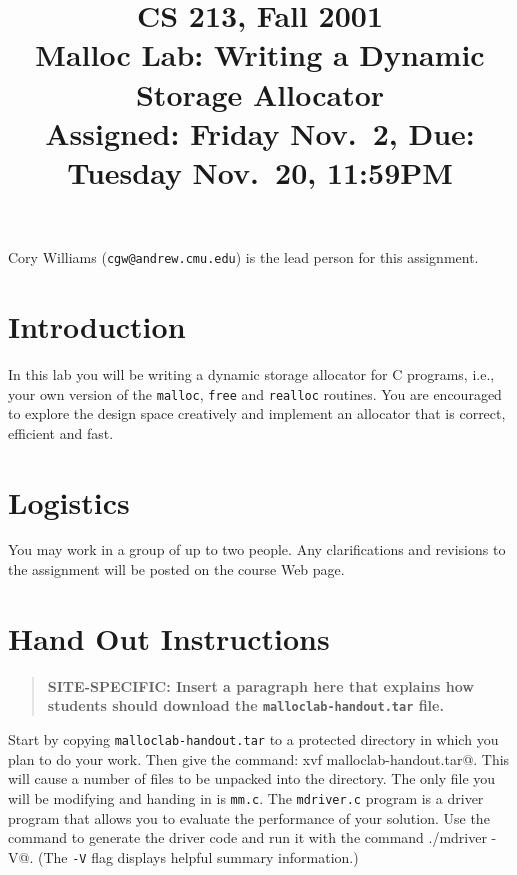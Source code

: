 \documentclass[11pt]{article}
\begin{document}
\title{CS 213, Fall 2001\\
Malloc Lab: Writing a Dynamic Storage Allocator\\
Assigned: Friday Nov.~2, Due: Tuesday Nov.~20, 11:59PM}

\author{}
\date{}


\maketitle

Cory Williams ({\tt cgw@andrew.cmu.edu}) is the lead person for this
assignment.

\section{Introduction}

In this lab you will be writing a dynamic storage allocator for C
programs, i.e., your own version of the {\tt malloc}, {\tt free} and
{\tt realloc} routines. You are encouraged to explore the design space
creatively and implement an allocator that is correct, efficient and
fast.

\section{Logistics}

You may work in a group of up to two people. Any clarifications and
revisions to the assignment will be posted on the course Web page.

\section{Hand Out Instructions}

\begin{quote}
\bf SITE-SPECIFIC: Insert a paragraph here that explains how students
should download the {\tt malloclab-handout.tar} file.
\end{quote}

Start by copying \texttt{malloclab-handout.tar} to a protected directory
in which you plan to do your work.  Then give the command:
\verb@tar xvf malloclab-handout.tar@.  This will cause a number of files
to be unpacked into the directory.  The only file you will be
modifying and handing in is {\tt mm.c}.  The {\tt mdriver.c} program
is a driver program that allows you to evaluate the performance of
your solution. Use the command \verb@make@ to generate the driver code
and run it with the command \verb@./mdriver -V@. (The {\tt -V} flag
displays helpful summary information.)
\end{document}
